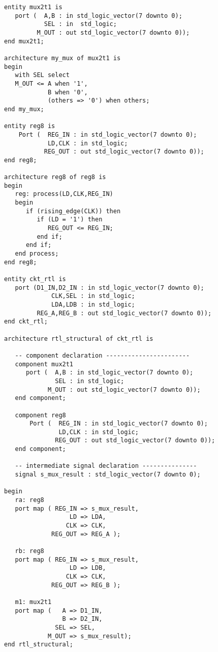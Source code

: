\begin{lstlisting}[label=ex25_code, caption=Solution to EXAMPLE 25 using a structural modelling approach.]
entity mux2t1 is
   port (  A,B : in std_logic_vector(7 downto 0); 
           SEL : in  std_logic; 
         M_OUT : out std_logic_vector(7 downto 0)); 
end mux2t1; 

architecture my_mux of mux2t1 is
begin 
   with SEL select
   M_OUT <= A when '1', 
            B when '0', 
            (others => '0') when others; 
end my_mux;

entity reg8 is
    Port (  REG_IN : in std_logic_vector(7 downto 0);
            LD,CLK : in std_logic;
           REG_OUT : out std_logic_vector(7 downto 0));
end reg8;

architecture reg8 of reg8 is
begin
   reg: process(LD,CLK,REG_IN)
   begin
      if (rising_edge(CLK)) then 
         if (LD = '1') then 
            REG_OUT <= REG_IN; 
         end if;
      end if;
   end process; 
end reg8;

entity ckt_rtl is
   port (D1_IN,D2_IN : in std_logic_vector(7 downto 0);
             CLK,SEL : in std_logic; 
             LDA,LDB : in std_logic; 
         REG_A,REG_B : out std_logic_vector(7 downto 0)); 
end ckt_rtl; 

architecture rtl_structural of ckt_rtl is 
 
   -- component declaration -----------------------
   component mux2t1 
      port (  A,B : in std_logic_vector(7 downto 0); 
              SEL : in std_logic; 
            M_OUT : out std_logic_vector(7 downto 0)); 
   end component; 

   component reg8 
       Port (  REG_IN : in std_logic_vector(7 downto 0);
               LD,CLK : in std_logic;
              REG_OUT : out std_logic_vector(7 downto 0));
   end component;

   -- intermediate signal declaration ---------------
   signal s_mux_result : std_logic_vector(7 downto 0); 
	
begin
   ra: reg8
   port map ( REG_IN => s_mux_result,
                  LD => LDA,
                 CLK => CLK,
             REG_OUT => REG_A ); 

   rb: reg8
   port map ( REG_IN => s_mux_result,
                  LD => LDB,
                 CLK => CLK,
             REG_OUT => REG_B ); 
				 
   m1: mux2t1
   port map (   A => D1_IN, 
                B => D2_IN,
              SEL => SEL,
            M_OUT => s_mux_result); 				 
end rtl_structural;
\end{lstlisting}

